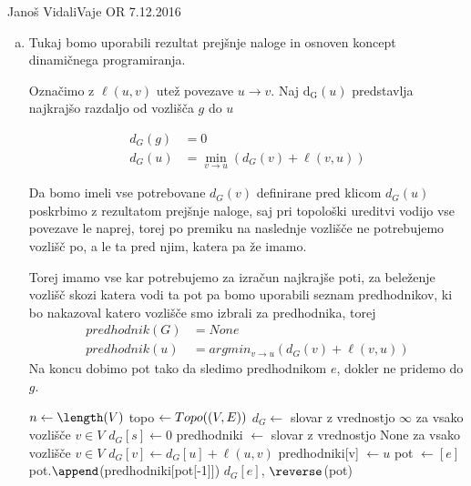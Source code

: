 \begin{naloga}{Janoš Vidali}{Vaje OR 7.12.2016}
\begin{odgovor}
\begin{enumerate}[(a)]
Po klicu $\operatorname{topo}(G)$, nam ta vrne ureditev vozlišč $[g, a, h, b, c, f, d, e]$.

\item Tukaj bomo uporabili rezultat prejšnje naloge in osnoven 
koncept dinamičnega programiranja.

Označimo z $\ell(u, v)$ utež povezave $u \rightarrow v$.
Naj $\operatorname{d_G}(u)$ predstavlja najkrajšo razdaljo od vozlišča $g$ do $u$

\begin{align*}
d_G(g) &= 0 \\
d_G(u) &= \min_{v \rightarrow u}(d_G(v) + \ell(v, u))
\end{align*}

Da bomo imeli vse potrebovane $d_G(v)$ definirane pred klicom $d_G(u)$
poskrbimo z rezultatom prejšnje naloge, saj pri topološki ureditvi vodijo vse povezave le naprej, 
torej po premiku na naslednje vozlišče ne potrebujemo vozlišč po, a le ta pred njim,
katera pa že imamo.

Torej imamo vse kar potrebujemo za izračun najkrajše poti, 
za beleženje vozlišč skozi katera vodi ta pot pa bomo uporabili seznam predhodnikov, 
ki bo nakazoval katero vozlišče smo izbrali za predhodnika, torej
\begin{align*}
predhodnik(G) &= None \\
predhodnik(u) &= argmin_{v \rightarrow u}(d_G(v) + \ell(v, u))
\end{align*}
Na koncu dobimo pot tako da sledimo predhodnikom $e$, dokler ne pridemo do $g$.  

\begin{small}
\begin{algorithmic}
	\State $n \gets \length(V)$
	\State topo $\gets {\sc Topo}((V, E))$
	\State $d_G \gets$ slovar z vrednostjo $\infty$ za vsako vozlišče $v \in V$
	\State $d_G[s] \gets 0$
	\State predhodniki $\gets$ slovar z vrednostjo None za vsako vozlišče $v \in V$
				\State $d_G[v] \gets d_G[u] + \ell(u, v)$
				\State predhodniki[v] $\gets u$
			\EndIf
		\EndFor
	\EndFor
	\State pot $\gets [e]$
		\State pot.$\append$(predhodniki[pot[-1]])
	\EndWhile
	\State \Return $d_G[e]$, $\reverse$(pot)
\EndFunction 
\end{algorithmic}
\end{small}


\end{enumerate}
\end{odgovor}
\end{naloga}
